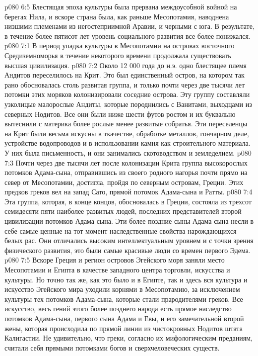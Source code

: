 \vs p080 6:5 Блестящая эпоха культуры была прервана междоусобной войной на берегах Нила, и вскоре страна была, как раньше Месопотамия, наводнена низшими племенами из негостеприимной Аравии, и черными с юга. В результате, в течение более пятисот лет уровень социального развития все более понижался.
\vs p080 7:1 В период упадка культуры в Месопотамии на островах восточного Средиземноморья в течение некоторого времени продолжала существовать высшая цивилизация.
\vs p080 7:2 Около 12 000 года до н.э. одно блестящее племя Андитов переселилось на Крит. Это был единственный остров, на котором так рано обосновалась столь развитая группа, и только почти через две тысячи лет потомки этих моряков колонизировали соседние острова. Эту группу составляли узколицые малорослые Андиты, которые породнились с Ванитами, выходцами из северных Нодитов. Все они были ниже шести футов ростом и их буквально вытеснили с материка более рослые менее развитые собратья. Эти переселенцы на Крит были весьма искусны в ткачестве, обработке металлов, гончарном деле, устройстве водопроводов и в использовании камня как строительного материала. У них была письменность, и они занимались скотоводством и земледелием.
\vs p080 7:3 Почти через две тысячи лет после колонизации Крита группа высокорослых потомков Адама\hyp{}сына, отправившись из своего родного нагорья почти прямо на север от Месопотамии, достигла, пройдя по северным островам, Греции. Этих предков греков вел на запад Сато, прямой потомок Адама\hyp{}сына и Ратты.
\vs p080 7:4 Эта группа, которая, в конце концов, обосновалась в Греции, состояла из трехсот семидесяти пяти наиболее развитых людей, последних представителей второй цивилизации потомков Адама\hyp{}сына. Эти более поздние сыны Адама\hyp{}сына несли в себе самые ценные на тот момент наследственные свойства нарождающихся белых рас. Они отличались высоким интеллектуальным уровнем и с точки зрения физического развития, это были самые красивые люди со времен первого Эдема.
\vs p080 7:5 \pc Вскоре Греция и регион островов Эгейского моря заняли место Месопотамии и Египта в качестве западного центра торговли, искусства и культуры. Но точно так же, как это было и в Египте, так и здесь вся культура и искусство Эгейского мира уходили корнями в Месопотамию, за исключением культуры тех потомков Адама\hyp{}сына, которые стали прародителями греков. Все искусство, весь гений этого более позднего народа есть прямое наследство потомков Адама\hyp{}сына, первого сына Адама и Евы, и его замечательной второй жены, которая происходила по прямой линии из чистокровных Нодитов штата Калигастии. Не удивительно, что греки, согласно их мифологическим преданиям, считали себя прямыми потомками богов и сверхчеловеческих существ.
